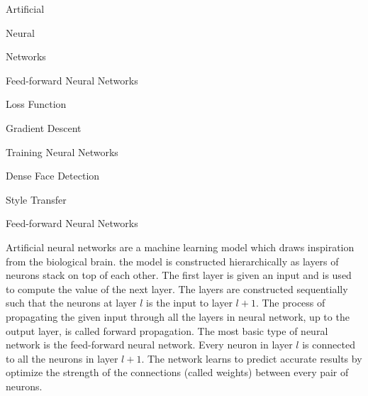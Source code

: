\documentclass[17pt]{extarticle}
\begin{document}
\begin{center}
{\fontsize{200}{20}\selectfont Artificial}

\vfill

{\fontsize{200}{20}\selectfont Neural}

\vfill

{\fontsize{200}{20}\selectfont Networks}
\end{center}

\newpage


\begin{center}
{\fontsize{60}{20}\selectfont Feed-forward Neural Networks}

\vfill

{\fontsize{60}{20}\selectfont Loss Function}

\vfill

{\fontsize{60}{20}\selectfont Gradient Descent}

\vfill

{\fontsize{60}{20}\selectfont Training Neural Networks}

\vfill

{\fontsize{60}{20}\selectfont Dense Face Detection}

\vfill

{\fontsize{60}{20}\selectfont Style Transfer}
\end{center}

\newpage
\begin{center}
{\fontsize{40}{20}\selectfont Feed-forward Neural Networks}
\end{center}

Artificial neural networks are a machine learning model which draws inspiration from the biological brain. the model is constructed hierarchically as layers of neurons stack on top of each other. The first layer is given an input and is used to compute the value of the next layer. The layers are constructed sequentially such that the neurons at layer $l$ is the input to layer $l+1$. The process of propagating the given input through all the layers in neural network, up to the output layer, is called forward propagation. The most basic type of neural network is the feed-forward neural network. Every neuron in layer $l$ is connected to all the neurons in layer $l+1$. The network learns to predict accurate results by optimize the strength of the connections (called weights) between every pair of neurons.
\end{document}
